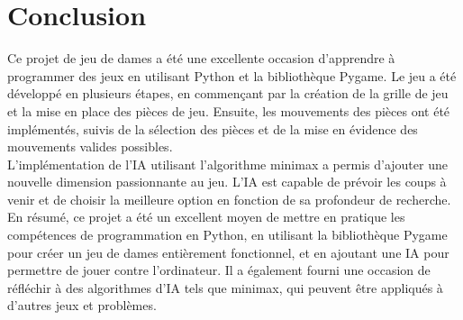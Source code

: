 \documentclass[12pt]{article}
\begin{document}
	\section{Conclusion}
	Ce projet de jeu de dames a été une excellente occasion d'apprendre à programmer des jeux en utilisant Python et la bibliothèque Pygame. Le jeu a été développé en plusieurs étapes, en commençant par la création de la grille de jeu et la mise en place des pièces de jeu. Ensuite, les mouvements des pièces ont été implémentés, suivis de la sélection des pièces et de la mise en évidence des mouvements valides possibles.\\
	
	L'implémentation de l'IA utilisant l'algorithme minimax a permis d'ajouter une nouvelle dimension passionnante au jeu. L'IA est capable de prévoir les coups à venir et de choisir la meilleure option en fonction de sa profondeur de recherche.\\
	
	En résumé, ce projet a été un excellent moyen de mettre en pratique les compétences de programmation en Python, en utilisant la bibliothèque Pygame pour créer un jeu de dames entièrement fonctionnel, et en ajoutant une IA pour permettre de jouer contre l'ordinateur. Il a également fourni une occasion de réfléchir à des algorithmes d'IA tels que minimax, qui peuvent être appliqués à d'autres jeux et problèmes.
\end{document}
